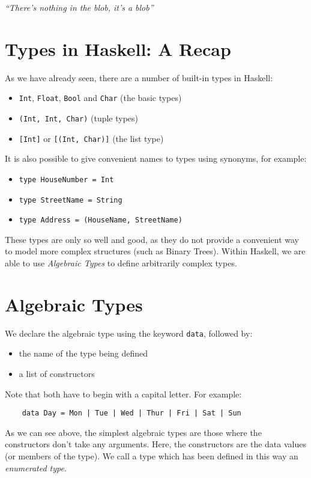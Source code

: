 
\textit{``There's nothing in the blob, it's a blob''}

\section{Types in Haskell: A Recap}
As we have already seen, there are a number of built-in types in Haskell:
\begin{itemize}
    \item \verb|Int|, \verb|Float|, \verb|Bool| and \verb|Char| (the basic types)
    \item \verb|(Int, Int, Char)| (tuple types)
    \item \verb|[Int]| or \verb|[(Int, Char)]| (the list type)
\end{itemize}

It is also possible to give convenient names to types using synonyms, for example:
\begin{itemize}
    \item \verb|type HouseNumber = Int|
    \item \verb|type StreetName = String|
    \item \verb|type Address = (HouseName, StreetName)|
\end{itemize}
These types are only so well and good, as they do not provide a convenient way to model more complex structures (such as Binary Trees). Within Haskell, we are able to use \textit{Algebraic Types} to define arbitrarily complex types.

\section{Algebraic Types}
We declare the algebraic type using the keyword \verb|data|, followed by:
\begin{itemize}
    \item the name of the type being defined
    \item a list of constructors
\end{itemize}
Note that both have to begin with a capital letter. For example:
\begin{verbatim}
    data Day = Mon | Tue | Wed | Thur | Fri | Sat | Sun
\end{verbatim}
As we can see above, the simplest algebraic types are those where the constructors don't take any arguments. Here, the constructors are the data values (or members of the type). We call a type which has been defined in this way an \textit{enumerated type}.

